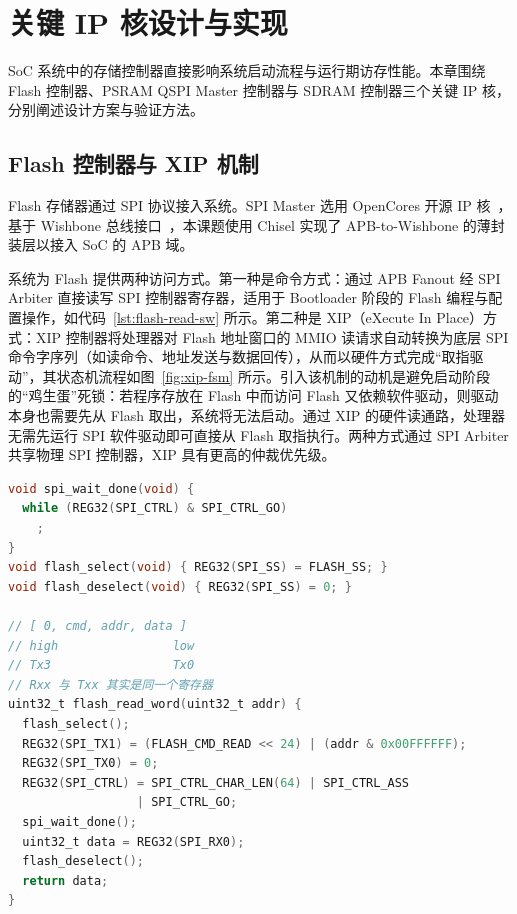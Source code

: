 
\chapter{关键 IP 核设计与实现}

SoC 系统中的存储控制器直接影响系统启动流程与运行期访存性能。本章围绕 Flash 控制器、PSRAM QSPI Master 控制器与 SDRAM 控制器三个关键 IP 核，分别阐述设计方案与验证方法。

\section{Flash 控制器与 XIP 机制}

Flash 存储器通过 SPI 协议接入系统。SPI Master 选用 OpenCores 开源 IP 核~\cite{opencores_simple_spi}，基于 Wishbone 总线接口~\cite{wishbone_b4}，本课题使用 Chisel 实现了 APB-to-Wishbone 的薄封装层以接入 SoC 的 APB 域。

系统为 Flash 提供两种访问方式。第一种是命令方式：通过 APB Fanout 经 SPI Arbiter 直接读写 SPI 控制器寄存器，适用于 Bootloader 阶段的 Flash 编程与配置操作，如代码~\ref{lst:flash-read-sw} 所示。第二种是 XIP（eXecute In Place）方式：XIP 控制器将处理器对 Flash 地址窗口的 MMIO 读请求自动转换为底层 SPI 命令字序列（如读命令、地址发送与数据回传），从而以硬件方式完成“取指驱动”，其状态机流程如图~\ref{fig:xip-fsm} 所示。引入该机制的动机是避免启动阶段的“鸡生蛋”死锁：若程序存放在 Flash 中而访问 Flash 又依赖软件驱动，则驱动本身也需要先从 Flash 取出，系统将无法启动。通过 XIP 的硬件读通路，处理器无需先运行 SPI 软件驱动即可直接从 Flash 取指执行。两种方式通过 SPI Arbiter 共享物理 SPI 控制器，XIP 具有更高的仲裁优先级。

\begin{lstlisting}[language=C,caption={SPI Flash 软件轮询读取实现示例},label={lst:flash-read-sw}]
void spi_wait_done(void) {
  while (REG32(SPI_CTRL) & SPI_CTRL_GO)
    ;
}
void flash_select(void) { REG32(SPI_SS) = FLASH_SS; }
void flash_deselect(void) { REG32(SPI_SS) = 0; }

// [ 0, cmd, addr, data ]
// high                low
// Tx3                 Tx0
// Rxx 与 Txx 其实是同一个寄存器
uint32_t flash_read_word(uint32_t addr) {
  flash_select();
  REG32(SPI_TX1) = (FLASH_CMD_READ << 24) | (addr & 0x00FFFFFF);
  REG32(SPI_TX0) = 0;
  REG32(SPI_CTRL) = SPI_CTRL_CHAR_LEN(64) | SPI_CTRL_ASS
                  | SPI_CTRL_GO;
  spi_wait_done();
  uint32_t data = REG32(SPI_RX0);
  flash_deselect();
  return data;
}
\end{lstlisting}

